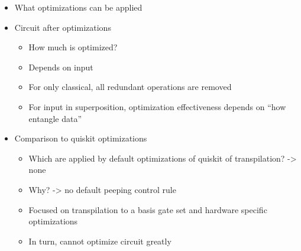 \begin{itemize}
    \item What optimizations can be applied
    \item Circuit after optimizations
    \begin{itemize}
        \item How much is optimized?
        \item Depends on input
        \item For only classical, all redundant operations are removed
        \item For input in superposition, optimization effectiveness depends on ``how entangle data''
    \end{itemize}
    \item Comparison to quiskit optimizations
    \begin{itemize}
        \item Which are applied by default optimizations of quiskit of transpilation? -> none
        \item Why? -> no default peeping control rule
        \item Focused on transpilation to a basis gate set and hardware specific optimizations 
        \item In turn, cannot optimize circuit greatly
    \end{itemize}
\end{itemize}